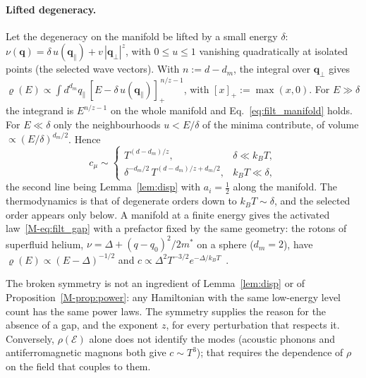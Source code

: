 \documentclass[10pt,a4paper]{article}
\theoremstyle{plain}
\theoremstyle{remark}
\newcommand{\enrg}{\mathcal{E}}  %
\begin{document}
\paragraph{Lifted degeneracy.} Let the degeneracy on the manifold be lifted
by a small energy $\delta$:
$\nu(\mathbf q)=\delta\,u(\mathbf q_\parallel)+v\,|\mathbf q_\perp|^{z}$,
with $0\le u\le1$ vanishing quadratically at isolated points (the selected
wave vectors). With $n:=d-d_m$, the integral over $\mathbf q_\perp$ gives
$\varrho(E)\propto\int d^{d_m}q_\parallel\,
[E-\delta\,u(\mathbf q_\parallel)]_+^{\,n/z-1}$, with $[x]_+:=\max(x,0)$.
For $E\gg\delta$ the integrand is $E^{n/z-1}$ on the whole manifold and
Eq.~\eqref{eq:filt_manifold} holds. For $E\ll\delta$ only the
neighbourhoods $u<E/\delta$ of the minima contribute, of volume
$\propto(E/\delta)^{d_m/2}$. Hence
\begin{equation}\label{eq:filt_neardeg}
  c_\mu\sim
  \begin{cases}
    T^{(d-d_m)/z} , & \delta\ll k_BT ,\\[2pt]
    \delta^{-d_m/2}\,T^{(d-d_m)/z+d_m/2} , & k_BT\ll\delta ,
  \end{cases}
\end{equation}
the second line being Lemma~\ref{lem:disp} with $a_i=\tfrac12$ along the
manifold. The thermodynamics is that of degenerate orders down to
$k_BT\sim\delta$, and the selected order appears only below. A manifold at
a finite energy gives the activated law~\eqref{M-eq:filt_gap} with a prefactor
fixed by the same geometry: the rotons of superfluid helium,
$\nu=\Delta+(q-q_0)^{2}/2m^{*}$ on a sphere ($d_m=2$), have
$\varrho(E)\propto(E-\Delta)^{-1/2}$ and
$c\propto\Delta^{2}T^{-3/2}e^{-\Delta/k_BT}$~\cite[Sec.~6.9.2]{Honerkamp}.

The broken symmetry is not an ingredient of Lemma~\ref{lem:disp} or of
Proposition~\ref{M-prop:power}: any Hamiltonian with the same low-energy level
count has the same power laws. The symmetry supplies the reason for the
absence of a gap, and the exponent $z$, for every perturbation that respects
it. Conversely, $\rho(\enrg)$ alone does not identify the modes (acoustic
phonons and antiferromagnetic magnons both give $c\sim T^{3}$); that
requires the dependence of $\rho$ on the field that couples to them.



\end{document}

